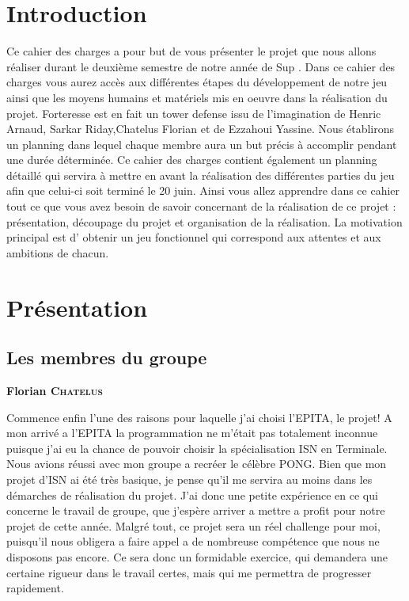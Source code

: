\documentclass[a4paper, 12pt]{article}
\begin{document}
\begin{spacing}{1.0}
	\tableofcontents
\end{spacing}

\newpage
\section{Introduction}
Ce cahier des charges a pour but de vous présenter le projet que nous allons réaliser durant le deuxième semestre de notre année de Sup . Dans ce cahier des charges vous aurez accès aux différentes étapes du développement de notre jeu ainsi que les moyens humains et matériels mis en oeuvre dans la réalisation du projet.
Forteresse est en fait un tower defense issu de l’imagination de Henric Arnaud, Sarkar Riday,Chatelus Florian et de Ezzahoui Yassine.
Nous établirons un planning dans lequel chaque membre aura un but précis à accomplir pendant une durée déterminée.
Ce cahier des charges contient également un planning détaillé qui servira à mettre en avant  la réalisation des différentes parties du jeu afin que celui-ci soit terminé le 20 juin.
Ainsi vous allez  apprendre  dans ce cahier tout ce que vous avez besoin de savoir concernant de la réalisation de ce projet : présentation, découpage du projet et organisation de la réalisation.
La motivation principal est  d’ obtenir un jeu fonctionnel qui correspond aux attentes  et aux ambitions de chacun.
\newpage

\section{Présentation}
	\subsection{Les membres du groupe}
	\parindent=0cm\textbf{Florian \textsc{Chatelus}}
	\smallbreak
	\par \parindent=0.5cm Commence enfin l'une des raisons pour laquelle j'ai choisi l'EPITA, le projet! A mon arrivé a l'EPITA la programmation ne m'était pas totalement inconnue puisque j'ai eu la chance de pouvoir choisir la spécialisation ISN en Terminale. Nous avions réussi avec mon groupe a recréer le célèbre PONG. Bien que mon projet d'ISN ai été très basique, je pense qu'il me servira au moins dans les démarches de réalisation du projet. J'ai donc une petite expérience en ce qui concerne le travail de groupe, que j'espère arriver a mettre a profit pour notre projet de cette année. Malgré tout, ce projet sera un réel challenge pour moi, puisqu'il nous obligera a faire appel a de nombreuse compétence que nous ne disposons pas encore. Ce sera donc un formidable exercice, qui demandera une certaine rigueur dans le travail certes, mais qui me permettra de progresser rapidement.\\
	
\end{document}
